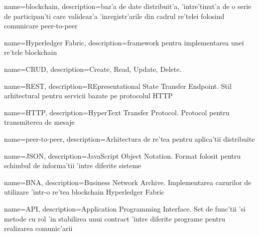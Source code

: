 {
    name=blockchain,
    description={baz'a de date distribuit'a, 'intre'tinut'a de o serie de participan'ti care valideaz'a 'inregistr'arile din cadrul re'telei folosind comunicare peer-to-peer}
}

{
    name=Hyperledger Fabric,
    description={framework pentru implementarea unei re'tele blockchain}
}

{
    name=CRUD,
    description={Create, Read, Update, Delete. }
}

{
    name=REST,
    description={REpresentational State Transfer Endpoint. Stil arhitectural pentru servicii bazate pe protocolul HTTP}
}

{
    name=HTTP,
    description={HyperText Transfer Protocol. Protocol pentru transmiterea de mesaje}
}

{
    name=peer-to-peer,
    description={Arhitectura de re'tea pentru aplica'tii distribuite}
}

{
    name=JSON,
    description={JavaScript Object Notation. Format folosit pentru schimbul de informa'tii 'intre diferite sisteme}
}

{
    name=BNA,
    description={Business Network Archive. Implementarea cazurilor de utilizare 'intr-o re'tea blockchain Hyperledger Fabric}
}

{
    name=API,
    description={Application Programming Interface. Set de func'tii 'si metode cu rol 'in stabilirea unui contract 'intre diferite programe pentru realizarea comunic'arii}
}
